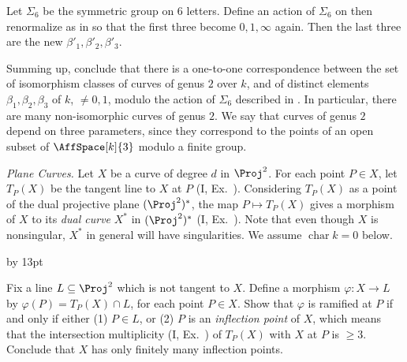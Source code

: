 {{{\noindent\hypertarget{ex-IV-2.2d}{}Let $\Sigma_6$ be the symmetric group on $6$ letters. Define an action of $\Sigma_6$ on
then renormalize as in  so that the first three become $0,1,\infty$ again. Then the last three are the new $\beta'_1,\beta'_2,\beta'_3$.

\noindent\hypertarget{ex-IV-2.2e}{}Summing up, conclude that there is a one-to-one correspondence between the set of isomorphism classes of curves of genus $2$ over $k$, and  of distinct elements $\beta_1,\beta_2,\beta_3$ of $k$, $\ne0,1$, modulo the action of $\Sigma_6$ described in . In particular, there are many non-isomorphic curves of genus $2$. We say that curves of genus $2$ depend on three parameters, since they correspond to the points of an open subset of $\AffSpace[k]{3}$ modulo a finite group.\par}

\smallskip
\noindent\hypertarget{ex-IV-2.3}{}\emph{Plane Curves.} Let $X$ be a curve of degree $d$\EditionText{} in $\Proj^2$. For each point $P\in X$, let $T_P(X)$ be the tangent line to $X$ at $P$ (I, Ex.~). Considering $T_P(X)$ as a point of the dual projective plane $(\Proj^2)^*$, the map $P\mapsto T_P(X)$ gives a morphism of $X$ to its \emph{dual curve} $X^*$ in $(\Proj^2)^*$ (I, Ex.~). Note that even though $X$ is nonsingular, $X^*$ in general will have singularities. We assume $\operatorname{char}k=0$ below.
{\advance\leftskip by 13pt\par
\noindent\hypertarget{ex-IV-2.3a}{}Fix a line $L\subseteq\Proj^2$ which is not tangent to $X$. Define a morphism $\varphi\colon X\to L$ by $\varphi(P)=T_P(X)\cap L$, for each point $P\in X$. Show that $\varphi$ is ramified at $P$ if and only if either (1) $P\in L$, or (2) $P$ is an \emph{inflection point} of $X$, which means that the intersection multiplicity (I, Ex.~) of $T_P(X)$ with $X$ at $P$ is $\geq3$. Conclude that $X$ has only finitely many inflection points.\par}\par}
}
